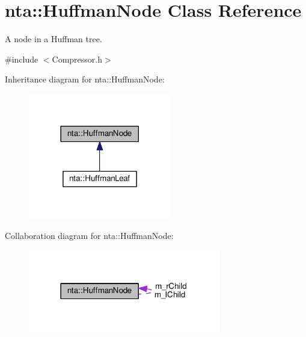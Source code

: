 \hypertarget{classnta_1_1HuffmanNode}{}\section{nta\+:\+:Huffman\+Node Class Reference}
\label{classnta_1_1HuffmanNode}


A node in a Huffman tree.  




{\ttfamily \#include $<$Compressor.\+h$>$}



Inheritance diagram for nta\+:\+:Huffman\+Node\+:
\nopagebreak
\begin{figure}[H]
\begin{center}
\leavevmode
\includegraphics[width=177pt]{d4/d0d/classnta_1_1HuffmanNode__inherit__graph}
\end{center}
\end{figure}


Collaboration diagram for nta\+:\+:Huffman\+Node\+:
\nopagebreak
\begin{figure}[H]
\begin{center}
\leavevmode
\includegraphics[width=238pt]{d5/d0a/classnta_1_1HuffmanNode__coll__graph}
\end{center}
\end{figure}
